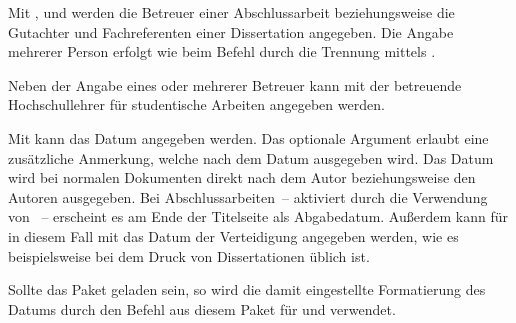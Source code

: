 \documentclass[%
  english,ngerman,%
  headings=optiontoheadandtoc,captions=tableheading,numbers=noenddot,%
  chapterpage,cdfoot,%
]{tudscrman}
\begin{document}
\begin{Declaration}{}
\begin{Declaration}{}
\begin{Declaration}{}
\begin{Declaration}{}
\printdeclarationlist%
%
%
%
Mit ,  und  werden die 
Betreuer einer Abschlussarbeit beziehungsweise die Gutachter und Fachreferenten 
einer Dissertation angegeben. Die Angabe mehrerer Person erfolgt wie beim Befehl 
 durch die Trennung mittels .

Neben der Angabe eines oder mehrerer Betreuer kann mit 
der betreuende Hochschullehrer für studentische Arbeiten angegeben werden.
\end{Declaration}
\end{Declaration}
\end{Declaration}
\end{Declaration}

\begin{Declaration}{}
\begin{Declaration}{}
\printdeclarationlist%
%
%
Mit  kann das Datum angegeben werden. Das optionale Argument 
erlaubt eine zusätzliche Anmerkung, welche nach dem Datum ausgegeben wird. Das 
Datum wird bei normalen Dokumenten direkt nach dem Autor beziehungsweise den 
Autoren ausgegeben. Bei Abschlussarbeiten~-- aktiviert durch die Verwendung von 
~-- erscheint es am Ende der Titelseite als Abgabedatum. Außerdem 
kann für in diesem Fall mit  das Datum der Verteidigung 
angegeben werden, wie es beispielsweise bei dem Druck von Dissertationen üblich 
ist.

Sollte das Paket  geladen sein, so wird die damit eingestellte 
Formatierung des Datums durch den Befehl  aus diesem Paket für 
 und  verwendet.
\end{Declaration}
\end{Declaration}
\end{document}
